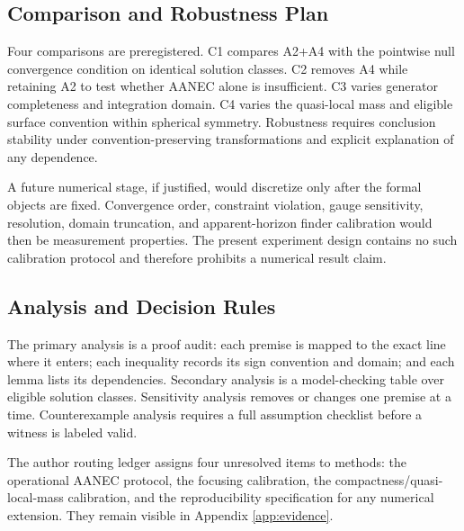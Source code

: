 \documentclass[conference]{IEEEtran}
\begin{document}
\subsection{Comparison and Robustness Plan}
Four comparisons are preregistered. C1 compares A2+A4 with the pointwise null convergence condition on identical solution classes. C2 removes A4 while retaining A2 to test whether AANEC alone is insufficient. C3 varies generator completeness and integration domain. C4 varies the quasi-local mass and eligible surface convention within spherical symmetry. Robustness requires conclusion stability under convention-preserving transformations and explicit explanation of any dependence.

A future numerical stage, if justified, would discretize only after the formal objects are fixed. Convergence order, constraint violation, gauge sensitivity, resolution, domain truncation, and apparent-horizon finder calibration would then be measurement properties. The present experiment design contains no such calibration protocol and therefore prohibits a numerical result claim.

\subsection{Analysis and Decision Rules}
The primary analysis is a proof audit: each premise is mapped to the exact line where it enters; each inequality records its sign convention and domain; and each lemma lists its dependencies. Secondary analysis is a model-checking table over eligible solution classes. Sensitivity analysis removes or changes one premise at a time. Counterexample analysis requires a full assumption checklist before a witness is labeled valid.

The author routing ledger assigns four unresolved items to methods: the operational AANEC protocol, the focusing calibration, the compactness/quasi-local-mass calibration, and the reproducibility specification for any numerical extension. They remain visible in Appendix \ref{app:evidence}.
\end{document}

